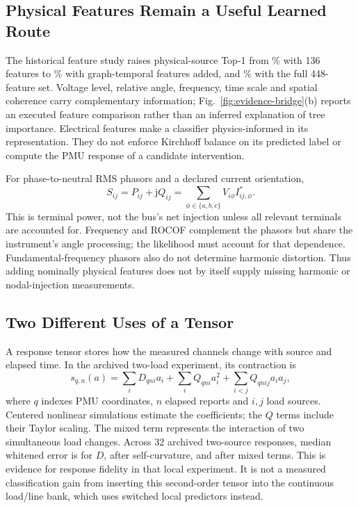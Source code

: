 \subsection{Physical Features Remain a Useful Learned Route}
The historical feature study raises physical-source Top-1 from
\BridgeBaseTop\% with 136 features to \BridgeGraphTop\% with graph-temporal
features added, and \BridgeFullTop\% with the full 448-feature set.
Voltage level, relative angle, frequency, time scale and spatial coherence
carry complementary information; Fig.~\ref{fig:evidence-bridge}(b) reports
an executed feature comparison rather than an inferred explanation of
tree importance. Electrical features make a classifier physics-informed
in its representation. They do not enforce Kirchhoff balance on its
predicted label or compute the PMU response of a candidate intervention.

For phase-to-neutral RMS phasors and a declared current orientation,
\begin{equation}
 S_{ij}=P_{ij}+\mathrm jQ_{ij}
       =\sum_{\phi\in\{a,b,c\}}V_{i\phi}I_{ij,\phi}^{*}.
 \label{eq:bridge-terminal-power}
\end{equation}
This is terminal power, not the bus's net injection unless all relevant
terminals are accounted for. Frequency and ROCOF complement the phasors
but share the instrument's angle processing; the likelihood must account
for that dependence. Fundamental-frequency phasors also do not determine
harmonic distortion. Thus adding nominally physical features does not
by itself supply missing harmonic or nodal-injection measurements.

\subsection{Two Different Uses of a Tensor}
A response tensor stores how the measured channels change with source
and elapsed time. In the archived two-load experiment, its contraction is
\begin{equation}
 s_{q,n}(a)=\sum_i D_{qni}a_i+\sum_i Q_{qni}a_i^2
               +\sum_{i<j}Q_{qnij}a_ia_j,
 \label{eq:bridge-response-tensor}
\end{equation}
where $q$ indexes PMU coordinates, $n$ elapsed reports and $i,j$ load
sources. Centered nonlinear simulations estimate the coefficients; the
$Q$ terms include their Taylor scaling. The mixed term represents the
interaction of two simultaneous load changes. Across 32 archived
two-source responses, median whitened error is \BridgeDError{} for $D$,
\BridgeQError{} after self-curvature, and \BridgeMixedError{} after mixed
terms. This is evidence for response fidelity in that local experiment.
It is not a measured classification gain from inserting this second-order
tensor into the continuous load/line bank, which uses switched local
predictors instead.

